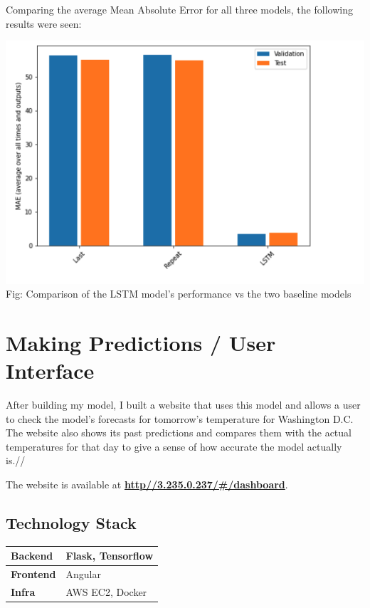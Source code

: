 \documentclass[paper=a4, fontsize=11pt, margin=1in]{scrartcl}
\numberwithin{equation}{section}		%
\numberwithin{figure}{section}			%
\numberwithin{table}{section}				%
\begin{document}
Comparing the average Mean Absolute Error for all three models, the following results were seen:\\
\begin{center}
    \includegraphics[width=\textwidth,height=0.3\textheight]{comparison.png}\\
    Fig: Comparison of the LSTM model's performance vs the two baseline models
\end{center}

\section{\textbf{Making Predictions / User Interface}}

After building my model, I built a website that uses this model and allows a user to check the model's forecasts for tomorrow's temperature for Washington D.C. The website also shows its past predictions and compares them with the actual temperatures for that day to give a sense of how accurate the model actually is.//

The website is available at \href{http://3.235.0.237/#/dashboard}{\textbf{http\://3.235.0.237/\#/dashboard}}.


\subsection{\textbf{Technology Stack}}


\begin{longtable}{|p{4.5cm}|p{7cm}|} 
\hline
\textbf{Backend} & Flask, Tensorflow \\ 
\hline
\textbf{Frontend} & Angular \\
\hline
\textbf{Infra} & AWS EC2, Docker \\
\hline
\end{longtable}
\end{document}
